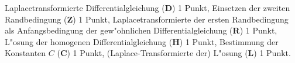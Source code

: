\begin{bewertung}
Laplacetransformierte Differentialgleichung ({\bf D}) 1 Punkt,
Einsetzen der zweiten Randbedingung ({\bf Z}) 1 Punkt,
Laplacetransformierte der ersten Randbedingung als Anfangsbedingung
der gew"ohnlichen Differentialgleichung ({\bf R}) 1 Punkt,
L"osung der homogenen Differentialgleichung ({\bf H}) 1 Punkt,
Bestimmung der Konstanten $C$ ({\bf C}) 1 Punkt,
(Laplace-Transformierte der) L"osung ({\bf L}) 1 Punkt.
\end{bewertung}
